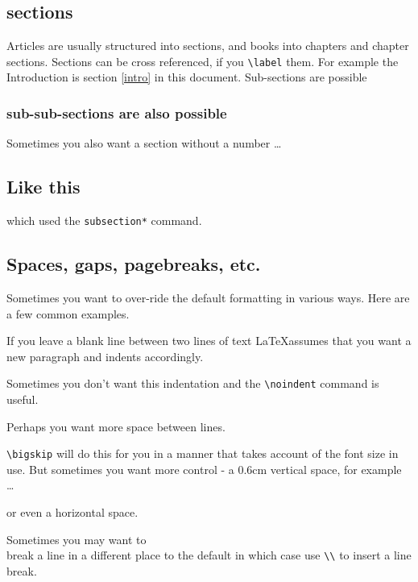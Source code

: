 \documentclass[11pt,a4paper]{article}
\begin{document}
\subsection{sections}

Articles are usually structured into sections, and books into chapters and chapter sections. Sections can be cross referenced, if you \verb+\label+ them. For example the Introduction is section \ref{intro} in this document. Sub-sections are possible

\subsubsection{sub-sub-sections are also possible}

Sometimes you also want a section without a number \ldots

\subsection*{Like this}

which used the \verb+subsection*+ command.

\subsection{Spaces, gaps, pagebreaks, etc.}

Sometimes you want to over-ride the default formatting in various ways. Here are a few common examples.

If you leave a blank line between two lines of text \LaTeX assumes that you want a new paragraph and indents accordingly. 

\noindent Sometimes you don't want this indentation and the \verb+\noindent+ command is useful.

Perhaps you want more space between lines.

\bigskip

\noindent \verb+\bigskip+ will do this for you in a manner that takes account of the font size in use. But sometimes you want more control - a 0.6cm vertical space, for example \ldots

\vspace{.6cm}

\noindent or even a \hspace{2cm}  horizontal space.

Sometimes you may want to \\ break a line in a different place to the default in which case use \verb+\\+ to insert a line break.
\end{document}
